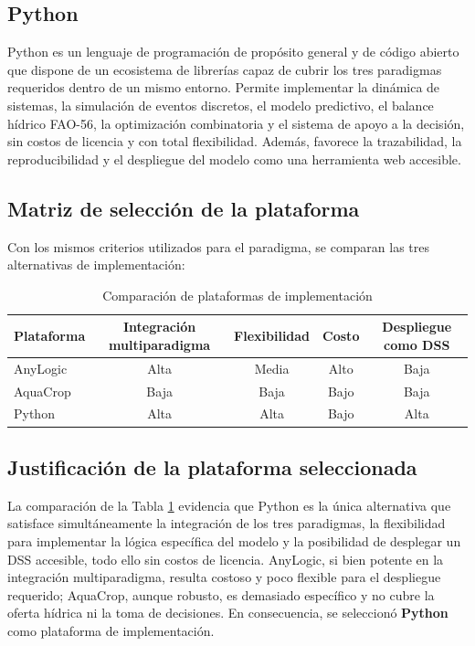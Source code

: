 \documentclass[12pt]{report}
\begin{document}
\subsection{Python}

Python es un lenguaje de programación de propósito general y de código abierto que dispone de un ecosistema de librerías capaz de cubrir los tres paradigmas requeridos dentro de un mismo entorno. Permite implementar la dinámica de sistemas, la simulación de eventos discretos, el modelo predictivo, el balance hídrico FAO-56, la optimización combinatoria y el sistema de apoyo a la decisión, sin costos de licencia y con total flexibilidad. Además, favorece la trazabilidad, la reproducibilidad y el despliegue del modelo como una herramienta web accesible.

\subsection{Matriz de selección de la plataforma}

Con los mismos criterios utilizados para el paradigma, se comparan las tres alternativas de implementación:

\begin{table}[H]
\centering
\begin{tabular}{lcccc}
\toprule
\textbf{Plataforma} & \textbf{Integración multiparadigma} & \textbf{Flexibilidad} & \textbf{Costo} & \textbf{Despliegue como DSS} \\
\midrule
AnyLogic & Alta & Media & Alto & Baja \\
AquaCrop & Baja & Baja & Bajo & Baja \\
Python   & Alta & Alta & Bajo & Alta \\
\bottomrule
\end{tabular}
\caption{Comparación de plataformas de implementación}
\label{tab:plataformas}
\end{table}

\subsection{Justificación de la plataforma seleccionada}

La comparación de la Tabla \ref{tab:plataformas} evidencia que Python es la única alternativa que satisface simultáneamente la integración de los tres paradigmas, la flexibilidad para implementar la lógica específica del modelo y la posibilidad de desplegar un DSS accesible, todo ello sin costos de licencia. AnyLogic, si bien potente en la integración multiparadigma, resulta costoso y poco flexible para el despliegue requerido; AquaCrop, aunque robusto, es demasiado específico y no cubre la oferta hídrica ni la toma de decisiones. En consecuencia, se seleccionó \textbf{Python} como plataforma de implementación.
\end{document}
